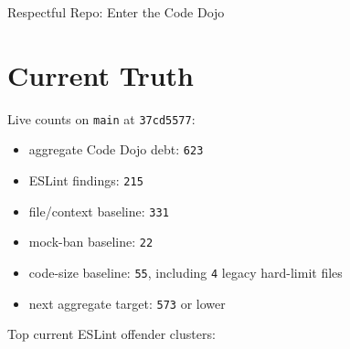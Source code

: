 \begin{CodeBlock}
Respectful Repo: Enter the Code Dojo
\end{CodeBlock}

\section{Current Truth}\label{record-238-current-truth}

Live counts on \texttt{m\allowbreak{}a\allowbreak{}i\allowbreak{}n} at \texttt{3\allowbreak{}7\allowbreak{}c\allowbreak{}d\allowbreak{}5\allowbreak{}5\allowbreak{}7\allowbreak{}7}:

\begin{itemize}
\tightlist
\item
  aggregate Code Dojo debt: \texttt{6\allowbreak{}2\allowbreak{}3}
\item
  ESLint findings: \texttt{2\allowbreak{}1\allowbreak{}5}
\item
  file/context baseline: \texttt{3\allowbreak{}3\allowbreak{}1}
\item
  mock-ban baseline: \texttt{2\allowbreak{}2}
\item
  code-size baseline: \texttt{5\allowbreak{}5}, including \texttt{4} legacy hard-limit files
\item
  next aggregate target: \texttt{5\allowbreak{}7\allowbreak{}3} or lower
\end{itemize}

Top current ESLint offender clusters:

